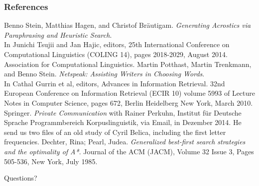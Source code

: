 \documentclass{beamer}
\begin{document}
\begin{frame}
\frametitle{References}
\scriptsize
\begin{thebibliography}{1}
	Benno Stein, Matthias Hagen, and Christof Bräutigam. \emph{Generating Acrostics via Paraphrasing and Heuristic Search}. \\
	In Junichi Tsujii and Jan Hajic, editors, 25th International Conference on Computational Linguistics (COLING 14), pages 2018-2029, August 2014. Association for Computational Linguistics.
	Martin Potthast, Martin Trenkmann, and Benno Stein.
	\emph{Netspeak: Assisting Writers in Choosing Words}. \\
	In Cathal Gurrin et al, editors, Advances in Information Retrieval. 32nd European Conference on Information Retrieval (ECIR 10) volume 5993 of Lecture Notes in Computer Science, pages 672, Berlin Heidelberg New York, March 2010. Springer.
\emph{Private Communication} with Rainer Perkuhn,
Institut für Deutsche Sprache Programmbereich Korpuslinguistik, via Email, in Dezember 2014. He send us two files of an old study of Cyril Belica, including the first letter frequencies.
	Dechter, Rina; Pearl, Judea. \emph{Generalized best-first search strategies and the optimality of A*}. Journal of the ACM (JACM), Volume 32 Issue 3, Pages 505-536, New York, July 1985.
\end{thebibliography}
\end{frame}

\begin{frame}
\Huge{\centerline{Questions?}}
\end{frame}

\end{document}
